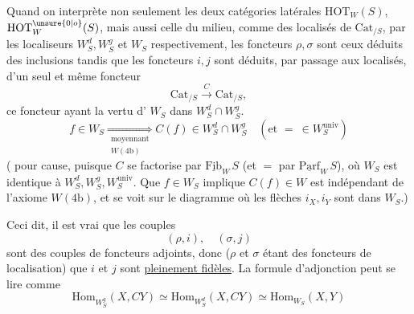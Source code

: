 Quand on interprète non seulement les deux catégories
latérales $\mathrm{HOT}_W(S)$, $\mathrm{HOT}_W^{\unsure{0|o}}(S)$, mais aussi celle du
milieu, comme des localisés de $\mathrm{Cat}_{/S}$, par les
localiseurs $W_S^d,W_S^g$ et $W_S$ respectivement, les foncteurs
$\rho,\sigma$ sont ceux déduits des  inclusions
tandis que les foncteurs $i,j$ sont déduits, 
par passage aux localisés, d'un seul et même
foncteur
\[
\mathrm{Cat}_{/S}\xrightarrow{C}\mathrm{Cat}_{/S},
\]
ce foncteur ayant la vertu d' $W_S$ dans
$W_S^d\cap W_S^g$.
\[
f\in W_S\underset{\substack{\text{moyennant}\\W(4\mathrm b)}}{\Longrightarrow}
 C(f)\in W_S^d\cap W_S^g\quad(\text{et }{=}\ \in W_S^{\mathrm{univ}})
\]
( pour cause, puisque $C$ se factorise par
$\underline{\mathrm{Fib}}_W\,S$ (et $=$ par $\underline{\mathrm{Parf}}_W\,S$), où $W_S$ est
identique à $W_S^d,W_S^g,W_S^{\mathrm{univ}}$. \deleted{\unsure{)}} Que $f\in W_S$ implique $C(f)\in W$ est indépendant de l'axiome
$W(4\mathrm b)$, et se voit sur le diagramme
où les flèches $i_X,i_Y$ sont dans $W_S$.)

Ceci dit, il est vrai que les  couples
\[
(\rho,i),\quad(\sigma,j)
\]
sont des couples de foncteurs adjoints, donc
($\rho$ et $\sigma$ étant des foncteurs de localisation) que $i$ et
$j$ sont \uline{pleinement fidèles}. La formule d'adjonction
peut se lire comme
\[
\boxed{\mathrm{Hom}_{W_S^g}(X,CY)\simeq\mathrm{Hom}_{W_S^d}(X,CY)
 \simeq\mathrm{Hom}_{W_S}(X,Y)}\tag*{$(*)$}
\]
